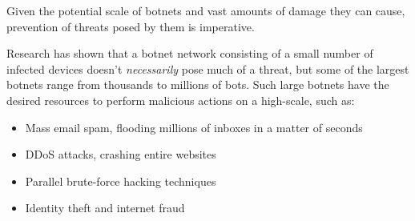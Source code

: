 \raggedright

Given the potential scale of botnets and vast amounts of damage they
can cause, prevention of threats posed by them is imperative.

Research has shown\textsuperscript{\cite{fabian2007my}} that a botnet network consisting of a small number of infected devices doesn't \textit{necessarily} pose much of a threat, but some of the largest botnets range from thousands to millions of bots. Such large botnets have the desired resources to perform malicious actions on a high-scale\textsuperscript{\cite{symantecbotnetthreats}}, such as:

\begin{itemize}
	\item Mass email spam, flooding millions of inboxes in a matter of seconds
	\item DDoS attacks, crashing entire websites
	\item Parallel brute-force hacking techniques
	\item Identity theft and internet fraud
\end{itemize}

